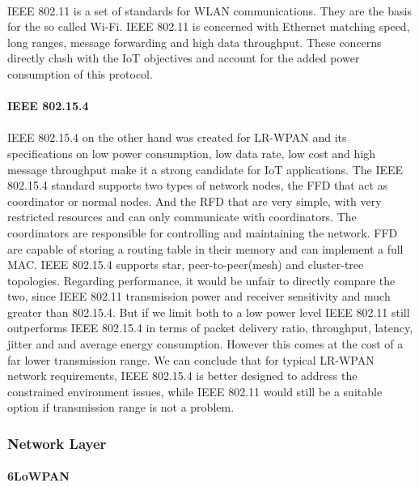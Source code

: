 \paragraph{}
IEEE 802.11 is a set of standards for \ac{WLAN} communications. They are the basis for the so called Wi-Fi. IEEE 802.11 is concerned with Ethernet matching speed, long ranges, message forwarding and high data throughput. These concerns directly clash with the \ac{IoT} objectives and account for the added power consumption of this protocol.

\paragraph{\textbf{IEEE 802.15.4}}
\paragraph{}
IEEE 802.15.4 on the other hand was created for \ac{LR-WPAN} and its specifications on low power consumption, low data rate, low cost and high message throughput make it a strong candidate for \ac{IoT} applications.
	The IEEE 802.15.4 standard supports two types of network nodes, the \ac{FFD} that act as coordinator or normal nodes. And the \ac{RFD} that are very simple, with very restricted resources and can only communicate with coordinators. The coordinators are responsible for controlling and maintaining the network. \ac{FFD} are capable of storing a routing table in their memory and can implement a full \ac{MAC}.
	IEEE 802.15.4 supports star, peer-to-peer(mesh) and cluster-tree topologies.
	Regarding performance, it would be unfair to directly compare the two, since IEEE 802.11 transmission power and receiver sensitivity and much greater than 802.15.4. But if we limit both to a low power level IEEE 802.11 still outperforms IEEE 802.15.4 in terms of packet delivery ratio, throughput, latency, jitter and and average energy consumption. However this comes at the cost of a far lower transmission range\cite{Transmission2011}.
	We can conclude that for typical \ac{LR-WPAN} network requirements, IEEE 802.15.4 is better designed to address the constrained environment issues, while IEEE 802.11 would still be a suitable option if transmission range is not a problem.

\subsubsection{Network Layer}

\paragraph{\textbf{6LoWPAN}}
